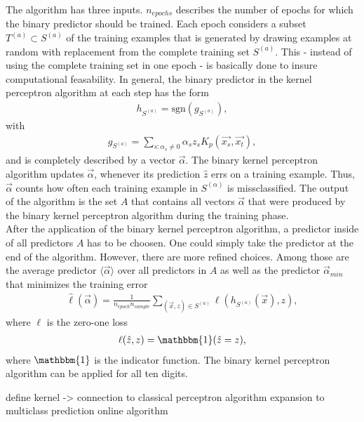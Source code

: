 The algorithm has three inputs. $n_{epochs}$ describes the number of epochs for which the binary predictor should be trained. Each epoch considers a subset $T^{(a)} \subset S^{(a)}$ of the training examples that is generated by drawing examples at random with replacement from the complete training set $S^{(a)}$. This - instead of using the complete training set in one epoch - is basically done to insure computational feasability. In general, the binary predictor in the kernel perceptron algorithm at each step has the form
\begin{align*}
	h_{S^{(a)}} = \mathrm{sgn}(g_{S^{(a)}}),
\end{align*}
with
\begin{align*}
	g_{S^{(a)}} = \sum_{s: \alpha_s \neq 0} \alpha_s z_s 	     	K_p(\vec{x_s}, \vec{x_t}),
\end{align*}
and is completely described by a vector $\vec{\alpha}$. The binary kernel perceptron algorithm updates $\vec{\alpha}$, whenever its prediction $\hat{z}$ errs on a training example. Thus, $\vec{\alpha}$ counts how often each training example in $S^{(\alpha)}$ is missclassified.
The output of the algorithm is the set $A$ that contains all vectors $\vec{\alpha}$ that were produced by the binary kernel perceptron algorithm during the training phase.\\

After the application of the binary kernel perceptron algorithm, a predictor inside of all predictors $A$ has to be choosen. One could simply take the predictor at the end of the algorithm. However, there are more refined choices. Among those are the average predictor $\langle \vec{\alpha} \rangle$ over all predictors in $A$ as well as the predictor $\vec{\alpha}_{min}$ that minimizes the training error 
\begin{align*}
	\hat{\ell}(\vec{\alpha}) = \frac{1}{n_{epoch} n_{sample}} \sum_{(\vec{x}, z) \in S^{(a)}} \ell(h_{S^{(a)}}(\vec{x}), z),
\end{align*}
where $\ell$ is the zero-one loss 
\begin{align*}
	\ell(\hat{z}, z) = \mathbbm{1}(\hat{z} = z),
\end{align*}
where $\mathbbm{1}$ is the indicator function.
The binary kernel perceptron algorithm can be applied for all ten digits.

define kernel -> connection to classical perceptron algorithm
expansion to multiclass prediction
online algorithm
